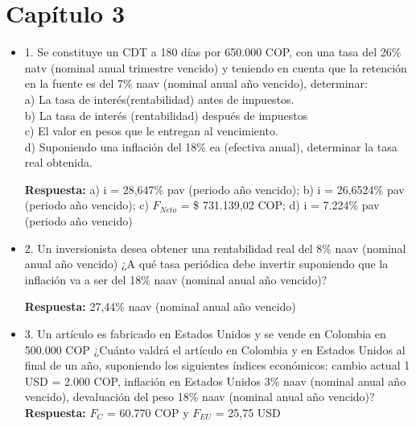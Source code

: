\chapter*{Capítulo 3}


\begin{itemize}

 \item 1. Se  constituye  un  CDT  a  180  días  por 650.000 COP,  con  una  tasa  del  26\% natv (nominal anual trimestre vencido) y teniendo  en  cuenta  que  la retención en la fuente es del 7\% naav (nominal anual año vencido), determinar:\\

       a) La tasa de interés(rentabilidad) antes de impuestos.\\
       b) La tasa de interés (rentabilidad) después de impuestos\\
       c) El valor en pesos que le entregan al vencimiento.\\
       d) Suponiendo una inflación del 18\% ea (efectiva anual), determinar la tasa real obtenida.
       
       \textbf{Respuesta:} a) i = 28,647\% pav (periodo año vencido); b) i = 26,6524\% pav (periodo año vencido); c) $F_{Neto}$ = \$ 731.139,02 COP; d) i = 7.224\% pav (periodo año vencido)\\
       \medskip

 \item 2. Un inversionista desea  obtener  una  rentabilidad  real  del  8\%  naav (nominal anual año vencido) ¿A qué tasa periódica debe invertir suponiendo que la inflación va a ser del 18\% naav (nominal anual año vencido)?

       \textbf{Respuesta:} 27,44\% naav (nominal anual año vencido)\\
       \medskip

 \item 3. Un  artículo  es  fabricado  en  Estados  Unidos  y  se  vende  en  Colombia  en 500.000 COP ¿Cuánto  valdrá  el  artículo  en  Colombia  y  en  Estados  Unidos  al final  de  un  año,  suponiendo  los  siguientes  índices  económicos: cambio actual 1 USD =  2.000 COP, inflación en Estados Unidos 3\% naav (nominal anual año vencido), devaluación del peso 18\% naav (nominal anual año vencido)?\\
       \textbf{Respuesta:} $F_{C}$ =  60.770 COP y $F_{EU}$ =  25,75 USD\\
       \medskip


\end{itemize}
